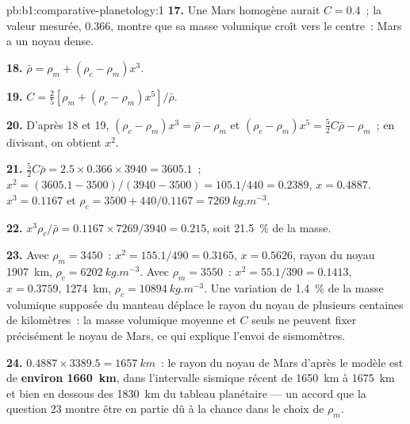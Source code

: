 \begin{solution}{pb:b1:comparative-planetology:1}
\textbf{17.} Une Mars homogène aurait $C = 0.4$~; la valeur mesurée, 0.366,
montre que sa masse volumique croît vers le centre~: Mars a un noyau dense.

\textbf{18.} $\bar\rho = \rho_m + (\rho_c - \rho_m)x^3$.

\textbf{19.} $C = \tfrac25[\rho_m + (\rho_c - \rho_m)x^5]/\bar\rho$.

\textbf{20.} D'après 18 et 19, $(\rho_c - \rho_m)x^3 = \bar\rho - \rho_m$ et
$(\rho_c - \rho_m)x^5 = \tfrac52C\bar\rho - \rho_m$~; en divisant, on obtient $x^2$.

\textbf{21.} $\tfrac52C\bar\rho = 2.5\times0.366\times3940 = 3605.1$~;
$x^2 = (3605.1 - 3500)/(3940 - 3500) = 105.1/440 = 0.2389$, $x = 0.4887$.
$x^3 = 0.1167$ et $\rho_c = 3500 + 440/0.1167 = \qty{7269}{kg.m^{-3}}$.

\textbf{22.} $x^3\rho_c/\bar\rho = 0.1167\times7269/3940 = 0.215$, soit
\qty{21.5}{\percent} de la masse.

\textbf{23.} Avec $\rho_m = 3450$~: $x^2 = 155.1/490 = 0.3165$, $x = 0.5626$,
rayon du noyau \qty{1907}{km}, $\rho_c = \qty{6202}{kg.m^{-3}}$. Avec $\rho_m =
3550$~: $x^2 = 55.1/390 = 0.1413$, $x = 0.3759$, \qty{1274}{km},
$\rho_c = \qty{10894}{kg.m^{-3}}$. Une variation de \qty{1.4}{\percent} de la
masse volumique supposée du manteau déplace le rayon du noyau de plusieurs
centaines de kilomètres~: la masse volumique moyenne et $C$ seuls ne peuvent
fixer précisément le noyau de Mars, ce qui explique l'envoi de sismomètres.

\textbf{24.} $0.4887\times3389.5 = \qty{1657}{km}$~: le rayon du noyau de Mars
d'après le modèle est de \textbf{environ \qty[text-series-to-math=true]{1660}{km}}, dans l'intervalle
sismique récent de \qty{1650}{km} à \qty{1675}{km} et bien en dessous des
\qty{1830}{km} du tableau planétaire --- un accord que la question 23 montre
être en partie dû à la chance dans le choix de $\rho_m$.
\end{solution}
